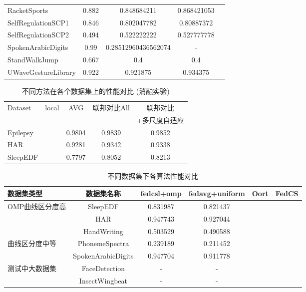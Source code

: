 \documentclass{article}
\begin{document}
\begin{CJK*}{UTF8}{gbsn}
\begin{table}[htbp]
{\begin{tabular}{lcccc}
    RacketSports & 0.882 & 0.848684211 & 0.868421053 \\
    SelfRegulationSCP1 & 0.846 & 0.802047782 & 0.80887372 \\
    SelfRegulationSCP2 & 0.494 & 0.522222222 & 0.527777778 \\
    SpokenArabicDigits & 0.99 & 0.28512960436562074 & - \\
    StandWalkJump & 0.667 & 0.4 & 0.4 \\
    UWaveGestureLibrary & 0.922 & 0.921875 & 0.934375 \\
    \bottomrule
  \end{tabular}%
  }
\end{table}

\begin{table}[htbp]
    \centering
    \caption{不同方法在各个数据集上的性能对比 (消融实验)}
    \label{tab:performance_comparison_rounded}
    \begin{tabular}{lcccc}
        \toprule
        \multirow{2}{*}{Dataset} & \multirow{2}{*}{local } & \multirow{2}{*}{ AVG} & \multirow{2}{*}{ 联邦对比All} &  联邦对比 \\
        & & & & +多尺度自适应 \\
        \midrule
        Epilepsy & & 0.9804 & 0.9839 & 0.9852 \\
        HAR      & & 0.9281 & 0.9342 & 0.9338 \\
        SleepEDF & & 0.7797 & 0.8052 & 0.8213 \\
        \bottomrule
    \end{tabular}
\end{table}

\begin{table}[htbp]
  \centering
  \caption{不同数据集下各算法性能对比}
  \begin{tabular}{lccccc}
    \toprule
    数据集类型 & 数据集名称 & fedcsl+omp & fedavg+uniform & Oort & FedCS \\
    \midrule
    \multirow{3}{*}{OMP曲线区分度高} & SleepEDF & 0.831987 & 0.821437 &  &  \\
    & HAR & 0.947743 & 0.927044 &  &  \\
    & HandWriting & 0.503529 & 0.490588 &  &  \\
    \midrule
    \multirow{2}{*}{曲线区分度中等} & PhonemeSpectra & 0.239189 & 0.211452 &  &  \\
    & SpokenArabicDigits & 0.947704 & 0.911778 &  &  \\
    \midrule
    测试中大数据集 & FaceDetection & - & - &  &  \\
    & InsectWingbeat & - & - &  &  \\
    \bottomrule
  \end{tabular}
  \label{tab:dataset_performance}
\end{table}

\end{CJK*}
\end{document}
